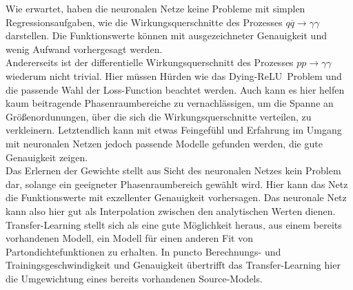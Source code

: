Wie erwartet, haben die neuronalen Netze keine Probleme mit simplen Regressionsaufgaben, wie die Wirkungsquerschnitte des Prozesses $q\overline{q} \rightarrow \gamma \gamma$ darstellen. Die Funktionswerte können mit ausgezeichneter Genauigkeit und wenig Aufwand vorhergesagt werden.\\
Andererseits ist der differentielle Wirkungsquerschnitt des Prozesses $pp \rightarrow \gamma \gamma$ wiederum nicht trivial. Hier müssen Hürden wie das \glqq Dying-ReLU\grqq~Problem und die passende Wahl der Loss-Function beachtet werden. Auch kann es hier helfen kaum beitragende Phasenraumbereiche zu vernachlässigen, um die Spanne an Größenordunungen, über die sich die Wirkungsquerschnitte verteilen, zu verkleinern. Letztendlich kann mit etwas Feingefühl und Erfahrung im Umgang mit neuronalen Netzen jedoch passende Modelle gefunden werden, die gute Genauigkeit zeigen.\\
Das Erlernen der Gewichte stellt aus Sicht des neuronalen Netzes kein Problem dar, solange ein geeigneter Phasenraumbereich gewählt wird. Hier kann das Netz die Funktionswerte mit exzellenter Genauigkeit vorhersagen. Das neuronale Netz kann also hier gut als Interpolation zwischen den analytischen Werten dienen. \\
Transfer-Learning stellt sich als eine gute Möglichkeit heraus, aus einem bereits vorhandenen Modell, ein Modell für einen anderen Fit von Partondichtefunktionen zu erhalten. In puncto Berechnungs- und Trainingsgeschwindigkeit und Genauigkeit übertrifft das Transfer-Learning hier die Umgewichtung eines bereits vorhandenen Source-Models.


